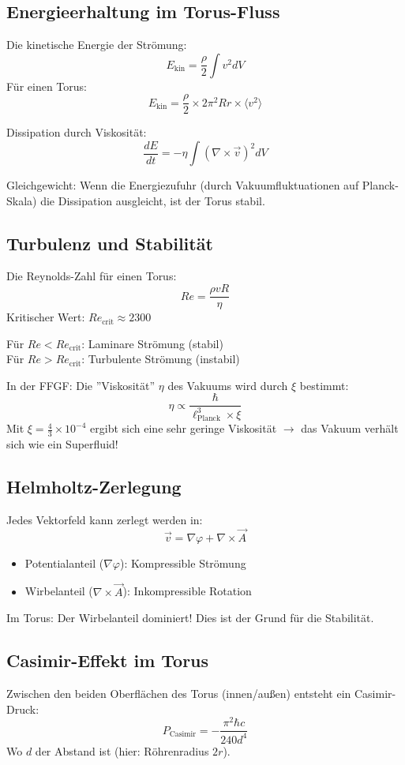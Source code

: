 	\subsection{Energieerhaltung im Torus-Fluss}
	Die kinetische Energie der Strömung:
	\[
	E_{\text{kin}} = \frac{\rho}{2} \int v^2 dV
	\]
	Für einen Torus:
	\[
	E_{\text{kin}} = \frac{\rho}{2} \times 2\pi^2 R r \times \langle v^2 \rangle
	\]
	
	Dissipation durch Viskosität:
	\[
	\frac{dE}{dt} = -\eta \int (\nabla \times \vec{v})^2 dV
	\]
	
	Gleichgewicht: Wenn die Energiezufuhr (durch Vakuumfluktuationen auf Planck-Skala) die Dissipation ausgleicht, ist der Torus stabil.
	
	\subsection{Turbulenz und Stabilität}
	Die Reynolds-Zahl für einen Torus:
	\[
	Re = \frac{\rho v R}{\eta}
	\]
	Kritischer Wert: \( Re_{\text{crit}} \approx 2300 \)
	
	Für \( Re < Re_{\text{crit}} \): Laminare Strömung (stabil) \\
	Für \( Re > Re_{\text{crit}} \): Turbulente Strömung (instabil)
	
	In der FFGF:
	Die ''Viskosität'' \( \eta \) des Vakuums wird durch \( \xi \) bestimmt:
	\[
	\eta \propto \frac{\hbar}{\ell_{\text{Planck}}^3 \times \xi}
	\]
	Mit \( \xi = \frac{4}{3} \times 10^{-4} \) ergibt sich eine sehr geringe Viskosität \( \rightarrow \) das Vakuum verhält sich wie ein Superfluid!
	
	\subsection{Helmholtz-Zerlegung}
	Jedes Vektorfeld kann zerlegt werden in:
	\[
	\vec{v} = \nabla \varphi + \nabla \times \vec{A}
	\]
	\begin{itemize}
		\item Potentialanteil (\( \nabla \varphi \)): Kompressible Strömung
		\item Wirbelanteil (\( \nabla \times \vec{A} \)): Inkompressible Rotation
	\end{itemize}
	
	Im Torus: Der Wirbelanteil dominiert! Dies ist der Grund für die Stabilität.
	
	\subsection{Casimir-Effekt im Torus}
	Zwischen den beiden Oberflächen des Torus (innen/außen) entsteht ein Casimir-Druck:
	\[
	P_{\text{Casimir}} = -\frac{\pi^2 \hbar c}{240 d^4}
	\]
	Wo \( d \) der Abstand ist (hier: Röhrenradius \( 2r \)).
	
